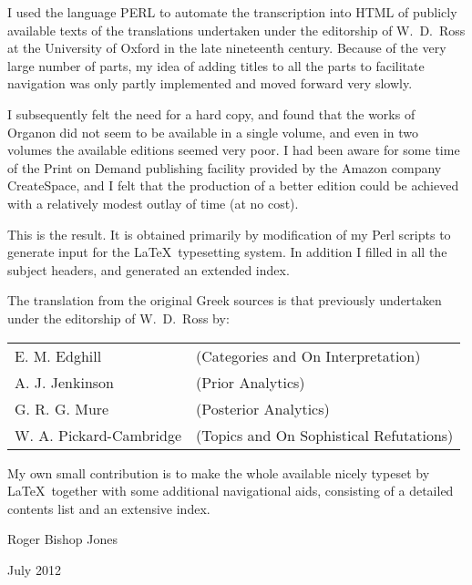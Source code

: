 I used the language PERL to automate the transcription into HTML of publicly
available texts of the translations undertaken under the editorship of
W.~D.~Ross at the University of Oxford in the late nineteenth century.
Because of the very large number of parts, my idea of adding titles to
all the parts to facilitate navigation was only partly implemented and
moved forward very slowly.

I subsequently felt the need for a hard copy, and found that the
works of Organon did not seem to be available in a single volume, and
even in two volumes the available editions seemed very poor.
I had been aware for some time of the Print on Demand publishing
facility provided by the Amazon company CreateSpace, and I felt that
the production of a better edition could be achieved with a relatively
modest outlay of time (at no cost).

This is the result.
It is obtained primarily by modification of my Perl scripts to generate input
for the \LaTeX\ typesetting system.
In addition I filled in all the subject headers, and generated an
extended index.

The translation from the original Greek sources is that previously undertaken under the editorship of W.~D.~Ross by:

\vspace{0.2in}

\begin{centering}
\begin{tabular}{l l}
E. M. Edghill & (Categories and On Interpretation)\\
A. J. Jenkinson & (Prior Analytics)\\
G. R. G. Mure & (Posterior Analytics)\\
W. A. Pickard-Cambridge & (Topics and On Sophistical Refutations)
\end{tabular}
\end{centering}

\vspace{0.2in}

My own small contribution is to make the whole available nicely typeset
by \LaTeX\ together with some additional navigational aids,
consisting of a detailed contents list and an extensive index.

Roger Bishop Jones

July 2012

\mainmatter



\backmatter

%
%



\printindex

\vfil



